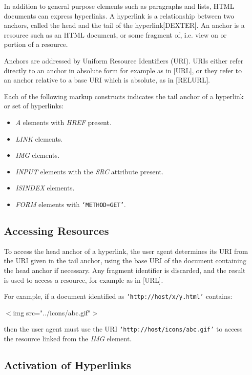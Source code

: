 In addition to general purpose elements such as paragraphs and
lists, HTML documents can express hyperlinks.  A hyperlink is a
relationship between two anchors, called the head and the tail of the
hyperlink[DEXTER].  An anchor is a resource such as an HTML document,
or some fragment of, i.e.  view on or portion of a resource.
\par \par 
Anchors are addressed by Uniform Resource Identifiers (URI).  URIs
either refer directly to an anchor in absolute form for example as in
[URL], or they refer to an anchor relative to a base URI which is
absolute, as in [RELURL].
\par \par 
Each of the following markup constructs indicates the tail anchor
of a hyperlink or set of hyperlinks:
\par \begin{itemize}\item {\it A} elements with {\it HREF} present.
\item {\it LINK} elements.
\item {\it IMG} elements.
\item {\it INPUT} elements with the {\it SRC} attribute present.
\item {\it ISINDEX} elements.
\item {\it FORM} elements with {\tt `METHOD=GET'}.
\end{itemize}\subsection*{Accessing Resources}\par 
To access the head anchor of a hyperlink, the user agent
determines its URI from the URI given in the tail anchor, using the
base URI of the document containing the head anchor if necessary.  Any
fragment identifier is discarded, and the result is used to access a
resource, for example as in [URL].
\par \par 
For example, if a document identified as {\tt `http://host/x/y.html'}
contains:
\par $<$img src="../icons/abc.gif"$>$
\par 
then the user agent must use the URI
{\tt `http://host/icons/abc.gif'} to access the resource linked from
the {\it IMG} element.
\par \subsection*{Activation of Hyperlinks}\par 
